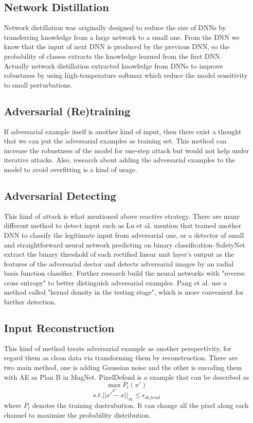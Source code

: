 \documentclass[twoside,twocolumn]{article}
\begin{document}
\subsection{Network Distillation}
Network distillation was originally designed to reduce the size of DNNs by transferring knowledge from a large network to a small one. From the DNN we know that the input of next DNN is produced by the previous DNN, so the probability of classes extracts the knowledge learned from the first DNN. Actually network distillation extracted knowledge from DNNs to improve robustness by using high-temperature softmax which reduce the model sensitivity to small perturbations.
\subsection{Adversarial (Re)training}
If adversarial example itself is another kind of input, then there exist a thought that we can put the adversarial examples as training set. This method can increase the robustness of the model for one-step attack but would not help under iterative attacks. Also, research about adding the adversarial examples to the model to avoid overfitting is a kind of usage.
\subsection{Adversarial Detecting}
This kind of attack is what mentioned above reactive strategy. There are many different method to detect input such as Lu et al. mention that trained another DNN to classify the legitimate input from adversarial one, or a detector of small and straightforward neural network predicting on binary classification--SafetyNet extract the binary threshold of each rectified linear unit layer's output as the features of the adversarial dector and detects adversarial images by an radial basis function classifier.
Further research build the neural networks with "reverse cross entropy" to better distinguish adversarial examples. Pang et al. use a method called "kernal density in the testing stage", which is more convenient for further detection.
\subsection{Input Reconstruction}
This kind of method treats adversarial example as another perspectivity, for regard them as clean data via transforming them by reconstruction. There are two main method, one is adding Gaussian noise and the other is encoding them with AE as Plan B in MagNet.
PixelDefend is a example that can be described as
$$\max_{x'} P_t(x')$$
$$s.t. ||x' - x||_{\infty} \le \epsilon_{defend}$$
where $P_t$ denotes the training dustrubution. It can change all the pixel along each channel to maximize the probability distribution.
\end{document}
